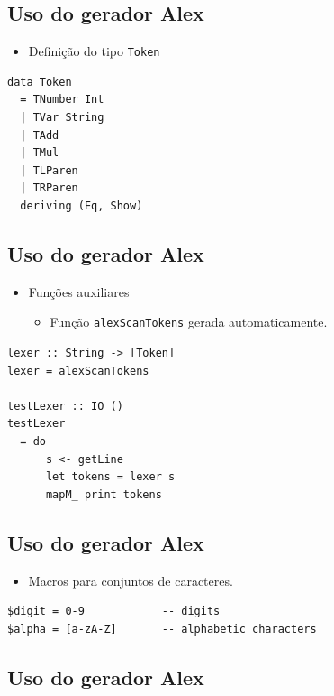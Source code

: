 \documentclass[11pt]{article}
\begin{document}
\subsection*{Uso do gerador Alex}
\label{sec:orgadc424f}

\begin{itemize}
\item Definição do tipo \texttt{Token}
\end{itemize}

\begin{verbatim}
data Token
  = TNumber Int
  | TVar String
  | TAdd
  | TMul
  | TLParen
  | TRParen
  deriving (Eq, Show)
\end{verbatim}
\subsection*{Uso do gerador Alex}
\label{sec:orgddafc31}

\begin{itemize}
\item Funções auxiliares
\begin{itemize}
\item Função \texttt{alexScanTokens} gerada automaticamente.
\end{itemize}
\end{itemize}

\begin{verbatim}
lexer :: String -> [Token]
lexer = alexScanTokens

testLexer :: IO ()
testLexer
  = do
      s <- getLine
      let tokens = lexer s
      mapM_ print tokens
\end{verbatim}
\subsection*{Uso do gerador Alex}
\label{sec:orga04618a}

\begin{itemize}
\item Macros para conjuntos de caracteres.
\end{itemize}

\begin{verbatim}
$digit = 0-9            -- digits
$alpha = [a-zA-Z]       -- alphabetic characters
\end{verbatim}
\subsection*{Uso do gerador Alex}
\label{sec:org4f1a7db}
\end{document}
